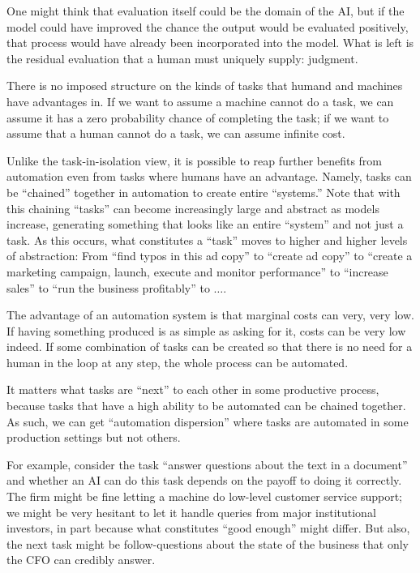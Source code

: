 \documentclass{article}
\begin{document}
One might think that evaluation itself could be the domain of the AI, but if the model could have improved the chance the output would be evaluated positively, that process would have already been incorporated into the model. 
What is left is the residual evaluation that a human must uniquely supply: judgment.

There is no imposed structure on the kinds of tasks that humand and machines have advantages in.
If we want to assume a machine cannot do a task, we can assume it has a zero probability chance of completing the task; if we want to assume that a human cannot do a task, we can assume infinite cost.

Unlike the task-in-isolation view, it is possible to reap further benefits from automation even from tasks where humans have an advantage.
Namely, tasks can be ``chained'' together in automation to create entire ``systems.''
Note that with this chaining ``tasks'' can become increasingly large and abstract as models increase, generating something that looks like an entire ``system'' and not just a task.
As this occurs, what constitutes a ``task'' moves to higher and higher levels of abstraction: 
From ``find typos in this ad copy'' to ``create ad copy'' to ``create a marketing campaign, launch, execute and monitor performance'' to ``increase sales'' to ``run the business profitably'' to $\ldots$.  

The advantage of an automation system is that marginal costs can very, very low.
If having something produced is as simple as asking for it, costs can be very low indeed.
If some combination of tasks can be created so that there is no need for a human in the loop at any step, the whole process can be automated. 

It matters what tasks are ``next'' to each other in some productive process, because tasks that have a high ability to be automated can be chained together.
As such, we can get ``automation dispersion'' where tasks are automated in some production settings but not others.

For example, consider the task ``answer questions about the text in a document'' and whether an AI can do this task depends on the payoff to doing it correctly. 
The firm might be fine letting a machine do low-level customer service support; we might be very hesitant to let it handle queries from major institutional investors, in part because what constitutes ``good enough'' might differ.
But also, the next task might be follow-questions about the state of the business that only the CFO can credibly answer.
\end{document}
